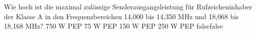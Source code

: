     {Wie hoch ist die maximal zulässige Senderausgangsleistung für Rufzeicheninhaber der Klasse A in den Frequenzbereichen 14,000 bis 14,350 MHz und 18,068 bis 18,168 MHz?}
    {750 W PEP}
    {75 W PEP}
    {150 W PEP}
    {250 W PEP}
    {false}{false}